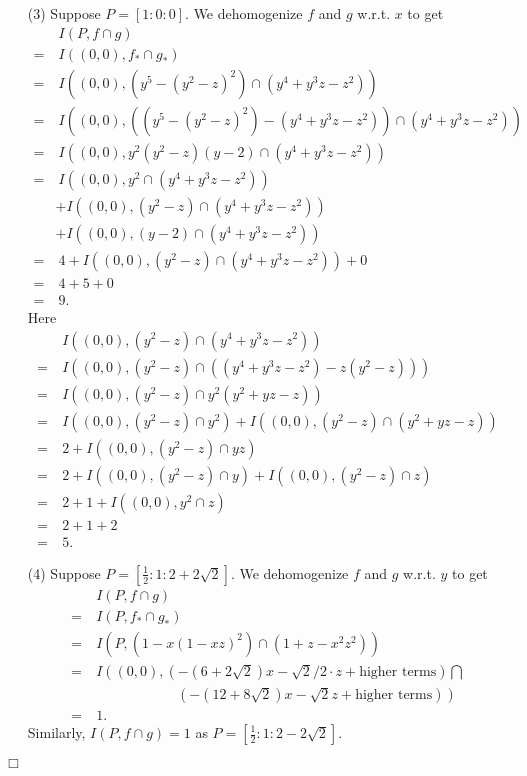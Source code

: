 \documentclass{article}
\begin{document}
\begin{enumerate}
\item[(3)]
  Suppose $P = [1:0:0]$.
  We dehomogenize $f$ and $g$ w.r.t. $x$ to get
  \begin{align*}
    & \:I(P, f \cap g) \\
    =& \: I((0,0), f_{*} \cap g_{*}) \\
    =& \: I((0,0), (y^5 - (y^2-z)^2) \cap (y^4 + y^3z - z^2)) \\
    =& \: I((0,0), ((y^5 - (y^2-z)^2) - (y^4 + y^3z - z^2)) \cap (y^4 + y^3z - z^2)) \\
    =& \: I((0,0), y^2(y^2-z)(y-2) \cap (y^4 + y^3z - z^2)) \\
    =& \: I((0,0), y^2 \cap (y^4 + y^3z - z^2)) \\
      & + I((0,0), (y^2-z) \cap (y^4 + y^3z - z^2)) \\
      & + I((0,0), (y-2) \cap (y^4 + y^3z - z^2)) \\
    =& \: 4 + I((0,0), (y^2-z) \cap (y^4 + y^3z - z^2)) + 0 \\
    =& \: 4 + 5 + 0 \\
    =& \: 9.
  \end{align*}
  Here
  \begin{align*}
    & \: I((0,0), (y^2-z) \cap (y^4 + y^3z - z^2)) \\
    =& \: I((0,0), (y^2-z) \cap ((y^4 + y^3z - z^2)-z(y^2-z))) \\
    =& \: I((0,0), (y^2-z) \cap y^2(y^2 +yz - z)) \\
    =& \: I((0,0), (y^2-z) \cap y^2) + I((0,0), (y^2-z) \cap (y^2 + yz - z)) \\
    =& \: 2 + I((0,0), (y^2-z) \cap yz) \\
    =& \: 2 + I((0,0), (y^2-z) \cap y) + I((0,0), (y^2-z) \cap z) \\
    =& \: 2 + 1 + I((0,0), y^2 \cap z) \\
    =& \: 2 + 1 + 2 \\
    =& \: 5.
  \end{align*}

\item[(4)]
  Suppose $P = \left[ \frac{1}{2}:1:2+2\sqrt{2} \right]$.
  We dehomogenize $f$ and $g$ w.r.t. $y$ to get
  \begin{align*}
    & \:I(P, f \cap g) \\
    =& \: I(P, f_{*} \cap g_{*}) \\
    =& \: I(P, (1 - x(1-xz)^2) \cap (1 + z - x^2z^2)) \\
    =& \: I\left( (0,0),
      \left( -(6+2\sqrt{2})x-\sqrt{2}/2 \cdot z + \text{higher terms} \right) \bigcap \right.\\
      & \qquad\qquad\qquad
      \left. ( -(12+8\sqrt{2})x-\sqrt{2} z + \text{higher terms}) \right) \\
    =& \: 1.
  \end{align*}
  Similarly, $I(P, f \cap g) = 1$ as $P = \left[ \frac{1}{2}:1:2-2\sqrt{2} \right]$.
\end{enumerate}
$\Box$ \\
\end{document}
